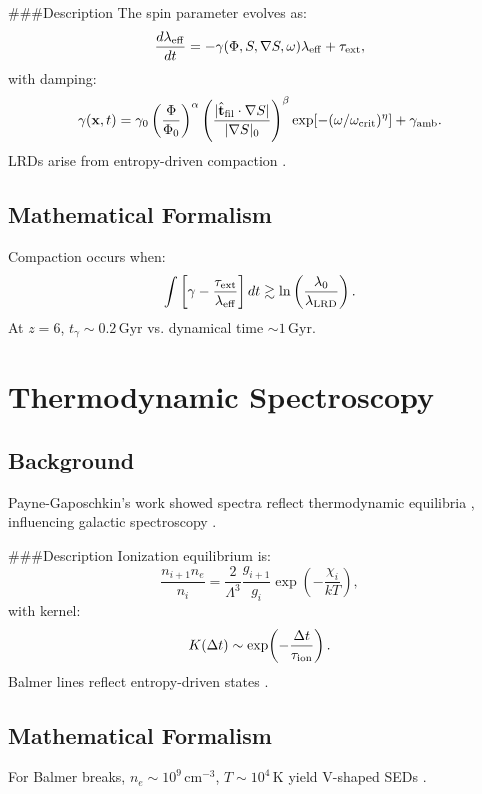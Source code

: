 \documentclass[12pt]{article}
\begin{document}
###{Description}
The spin parameter evolves as:
\begin{equation}
\frac{d\lambda_{\rm eff}}{dt} = -\gamma(\Phi,S,\nabla S,\omega) \lambda_{\rm eff} + \tau_{\rm ext},
\end{equation}
with damping:
\begin{equation}
\gamma(\mathbf{x},t) = \gamma_0 \left(\frac{\Phi}{\Phi_0}\right)^{\alpha} \left(\frac{|\hat{\mathbf{t}}_{\rm fil}\cdot \nabla S|}{|\nabla S|_0}\right)^{\beta} \exp\!\left[-(\omega/\omega_{\rm crit})^\eta\right] + \gamma_{\rm amb}.
\end{equation}
LRDs arise from entropy-driven compaction \citep{PacucciLoeb2025}.

\subsection{Mathematical Formalism}
Compaction occurs when:
\begin{equation}
\int \left[\gamma - \frac{\tau_{\rm ext}}{\lambda_{\rm eff}}\right] dt \gtrsim \ln\left(\frac{\lambda_0}{\lambda_{\rm LRD}}\right).
\end{equation}
At $z=6$, $t_\gamma \sim 0.2 \, \text{Gyr}$ vs. dynamical time $\sim 1 \, \text{Gyr}$.

\section{Thermodynamic Spectroscopy}
\subsection{Background}
Payne-Gaposchkin’s work showed spectra reflect thermodynamic equilibria \citep{Payne1925}, influencing galactic spectroscopy \citep{Maiolino2025}.

###{Description}
Ionization equilibrium is:
\begin{equation}
\frac{n_{i+1}n_e}{n_i} = \frac{2}{\Lambda^3} \frac{g_{i+1}}{g_i} \exp\!\left(-\frac{\chi_i}{kT}\right),
\end{equation}
with kernel:
\begin{equation}
K(\Delta t) \sim \exp\!\left(-\frac{\Delta t}{\tau_{\rm ion}}\right).
\end{equation}
Balmer lines reflect entropy-driven states \citep{Maiolino2025}.

\subsection{Mathematical Formalism}
For Balmer breaks, $n_e \sim 10^9 \, \text{cm}^{-3}$, $T \sim 10^4 \, \text{K}$ yield V-shaped SEDs \citep{Maiolino2025}.
\end{document}
